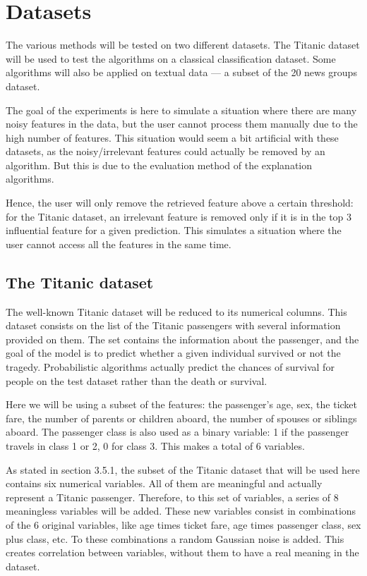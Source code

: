 \documentclass[a4paper,11pt]{kth-mag}
\begin{document}
\section{Datasets}

The various methods will be tested on two different datasets. The Titanic dataset will be used to test the algorithms on a classical classification dataset. Some algorithms will also be applied on textual data --- a subset of the 20 news groups dataset.

The goal of the experiments is here to simulate a situation where there are many noisy features in the data, but the user cannot process them manually due to the high number of features. This situation would seem a bit artificial with these datasets, as the noisy/irrelevant features could actually be removed by an algorithm. But this is due to the evaluation method of the explanation algorithms.

Hence, the user will only remove the retrieved feature above a certain threshold: for the Titanic dataset, an irrelevant feature is removed only if it is in the top 3 influential feature for a given prediction. This simulates a situation where the user cannot access all the features in the same time.

\subsection{The Titanic dataset}

The well-known Titanic dataset will be reduced to its numerical columns. This dataset consists on the list of the Titanic passengers with several information provided on them. The set contains the information about the passenger, and the goal of the model is to predict whether a given individual survived or not the tragedy. Probabilistic algorithms actually predict the chances of survival for people on the test dataset rather than the death or survival.

Here we will be using a subset of the features: the passenger's age, sex, the ticket fare, the number of parents or children aboard, the number of spouses or siblings aboard. The passenger class is also used as a binary variable: 1 if the passenger travels in class 1 or 2, 0 for class 3. This makes a total of 6 variables.

As stated in section 3.5.1, the subset of the Titanic dataset that will be used here contains six numerical variables. All of them are meaningful and actually represent a Titanic passenger. Therefore, to this set of variables, a series of 8 meaningless variables will be added. These new variables consist in combinations of the 6 original variables, like age times ticket fare, age times passenger class, sex plus class, etc. To these combinations a random Gaussian noise is added. This creates correlation between variables, without them to have a real meaning in the dataset.
\end{document}
